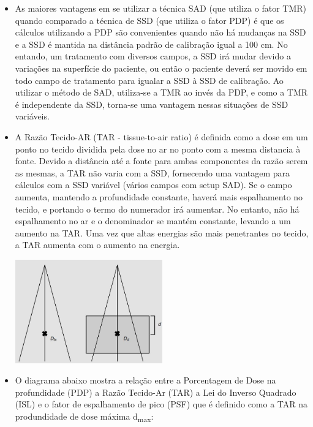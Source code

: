 \documentclass[11pt,a4paper]{article}
\newcounter{exemplo}
\begin{document}
\begin{exemplo}
\begin{itemize}
        \item As maiores vantagens em se utilizar a técnica SAD (que utiliza o fator TMR) quando comparado a técnica de SSD (que utiliza o fator PDP) é que os cálculos utilizando a PDP são convenientes quando não há mudanças na SSD e a SSD é mantida na distância padrão de calibração igual a 100 cm. No entando, um tratamento com diversos campos, a SSD irá mudar devido a variações na superfície do paciente, ou então o paciente deverá ser movido em todo campo de tratamento para igualar a SSD à SSD de calibração. Ao utilizar o método de SAD, utiliza-se a TMR ao invés da PDP, e como a TMR é independente da SSD, torna-se uma vantagem nessas situações de SSD variáveis. 
        
        \item A Razão Tecido-AR (TAR - tissue-to-air ratio) é definida como a dose em um ponto no tecido dividida pela dose no ar no ponto com a mesma distancia à fonte. Devido a distância até a fonte para ambas componentes da razão serem as mesmas, a TAR não varia com a SSD, fornecendo uma vantagem para cálculos com a SSD variável (vários campos com setup SAD). Se o campo aumenta, mantendo a profundidade constante, haverá mais espalhamento no tecido, e portando o termo do numerador irá aumentar. No entanto, não há espalhamento no ar e o denominador se mantém constante, levando a um aumento na TAR. Uma vez que altas energias são mais penetrantes no tecido, a TAR aumenta com o aumento na energia.

            \begin{center}
                \includegraphics[width=0.5\textwidth]{Imagens/tar.JPG}
            \end{center}
        
        \item O diagrama abaixo mostra a relação entre a Porcentagem de Dose na profundidade (PDP) a  Razão Tecido-Ar (TAR) a Lei do Inverso Quadrado (ISL) e o fator de espalhamento de pico (PSF) que é definido como a TAR na produndidade de dose máxima d\textsubscript{max}:
        

\end{itemize}
\end{exemplo}
\end{document}
